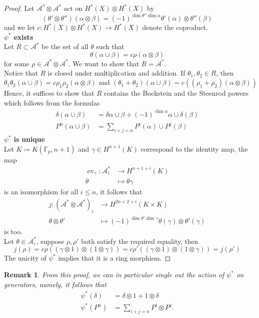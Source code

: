 \documentclass[11pt, a4paper]{article}
\DeclareMathOperator*{\ev}{ev}
\newtheorem{rmk}[thm]{Remark}
\theoremstyle{plain}
\newtheorem*{proof}{Proof}
\begin{document}
\begin{proof}
Let $\mathcal{A}^{\ast}\otimes \mathcal{A}^{\ast}$ act on $H^{\ast}( X) \otimes H^{\ast}( X) $ by
\[ 
( \theta'\otimes\theta'' )( \alpha\otimes \beta) = ( -1)^{\dim \theta''\dim \alpha}\theta'( \alpha) \otimes \theta''( \beta) 
\]
and we let $c: H^{\ast}( X) \otimes H^{\ast}( X) \to H^{\ast}( X) $ denote the coproduct.\\
\textbf{$\psi^{\ast}$ exists}\\
Let $R \subset \mathcal{A}^{\ast}$ be the set of all $\theta$ such that 
\[ 
\theta( \alpha\cup \beta) = c \rho ( \alpha\otimes \beta) 
\]
for some $\rho \in \mathcal{A}^{\ast}\otimes \mathcal{A}^{\ast}$. We want to show that $R = \mathcal{A}^{\ast}$.\\
Notice that $R$ is closed under multiplication and addition. If $\theta_1, \theta_2\in R$, then 
\[ 
	\theta_1\theta_2( \alpha\cup \beta) = c\rho_1\rho_2( \alpha\otimes \beta) \text{ and } 	( \theta_1 + \theta_2) ( \alpha\cup \beta) = c (  ( \rho_1 + \rho_2 )( \alpha \otimes \beta ) )
\]
Hence, it suffices to show that $R$ contains the Bockstein and the Steenrod powers which follows from the formulas
\begin{align*}
	\delta( \alpha\cup \beta) &= \delta \alpha\cup \beta + ( -1)^{\dim \alpha}\alpha \cup \delta( \beta) \\
	P^{n}( \alpha\cup \beta) &= \sum_{i+j =n}  P^{i}( \alpha) \cup P^{j}( \beta) 
\end{align*}
\textbf{$\psi^{\ast}$ is unique}\\
Let $K \coloneq K( \mathbb{F}_p, n+1) $ and $\gamma \in H^{n+1}( K) $ correspond to the identity map, the map
\begin{align*}
	\ev_{\gamma} \colon \mathcal{A}^{\ast}_i &\to H^{n+1+i}( K) \\
	\theta &\mapsto \theta\gamma
\end{align*}
is an isomorphism for all $i \leq n$, it follows that
\begin{align*}
	j\colon \left( \mathcal{A}^{\ast} \otimes \mathcal{A}^{\ast} \right)_i &\to H^{2n+2+i}( K\times K) \\
	\theta\otimes \theta'&\mapsto ( -1)^{\dim\theta'\dim\gamma} \theta( \gamma) \otimes \theta'( \gamma) 
\end{align*}
is too.\\
Let $\theta\in \mathcal{A}^{\ast}_i$, suppose $\rho, \rho'$ both satisfy the required equality, then
\[ 
j( \rho) =c\rho\left( ( \gamma\otimes 1) \otimes ( 1\otimes \gamma) \right) = c\rho'\left( ( \gamma\otimes 1)\otimes ( 1\otimes \gamma)  \right) =j(\rho' ) 
\]
The unicity of $\psi^{\ast}$ implies that it is a ring morphism.
\end{proof}
\begin{rmk}\label{rmk_psi_dual}
From this proof, we can in particular single out the action of $\psi^{\ast}$ on generators, namely, it follows that 
\begin{align*}
	\psi^{\ast}( \delta) &= \delta\otimes 1 + 1 \otimes \delta\\
	\psi^{\ast}( P^{n}) &= \sum_{i+j=n} P^{i}\otimes P^{j}.
\end{align*}
\end{rmk}
\end{document}
